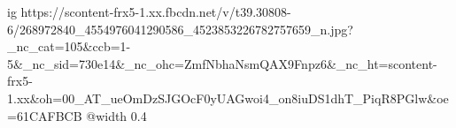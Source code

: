  
 
 
 
 

\ifcmt
  ig https://scontent-frx5-1.xx.fbcdn.net/v/t39.30808-6/268972840_4554976041290586_4523853226782757659_n.jpg?_nc_cat=105&ccb=1-5&_nc_sid=730e14&_nc_ohc=ZmfNbhaNsmQAX9Fnpz6&_nc_ht=scontent-frx5-1.xx&oh=00_AT_ueOmDzSJGOcF0yUAGwoi4_on8iuDS1dhT_PiqR8PGlw&oe=61CAFBCB
  @width 0.4
\fi
